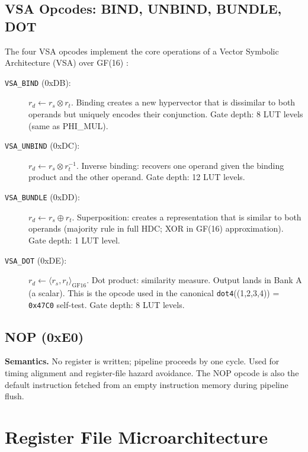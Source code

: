 \subsection{VSA Opcodes: BIND, UNBIND, BUNDLE, DOT}
\label{subsec:71:vsa-opcodes}

The four VSA opcodes implement the core operations of a Vector Symbolic
Architecture (VSA) over GF(16) \cite{kanerva2009hyperdimensional}:

\begin{description}
  \item[\texttt{VSA\_BIND} (0xDB):] $r_d \leftarrow r_s \otimes r_t$.
    Binding creates a new hypervector that is dissimilar to both
    operands but uniquely encodes their conjunction.
    Gate depth: 8 LUT levels (same as PHI\_MUL).
  \item[\texttt{VSA\_UNBIND} (0xDC):] $r_d \leftarrow r_s \otimes r_t^{-1}$.
    Inverse binding: recovers one operand given the binding product
    and the other operand.  Gate depth: 12 LUT levels.
  \item[\texttt{VSA\_BUNDLE} (0xDD):] $r_d \leftarrow r_s \oplus r_t$.
    Superposition: creates a representation that is similar to both
    operands (majority rule in full HDC; XOR in GF(16) approximation).
    Gate depth: 1 LUT level.
  \item[\texttt{VSA\_DOT} (0xDE):] $r_d \leftarrow \langle r_s, r_t \rangle_{\mathrm{GF}16}$.
    Dot product: similarity measure.  Output lands in Bank A
    (a scalar). This is the opcode used in the canonical
    \texttt{dot4}((1,2,3,4)) = \texttt{0x47C0} self-test.
    Gate depth: 8 LUT levels.
\end{description}

\subsection{NOP (0xE0)}
\label{subsec:71:nop}

\textbf{Semantics.} No register is written; pipeline proceeds by one
cycle.  Used for timing alignment and register-file hazard avoidance.
The NOP opcode is also the default instruction fetched from an empty
instruction memory during pipeline flush.

\section{Register File Microarchitecture}
\label{sec:71:microarch}

